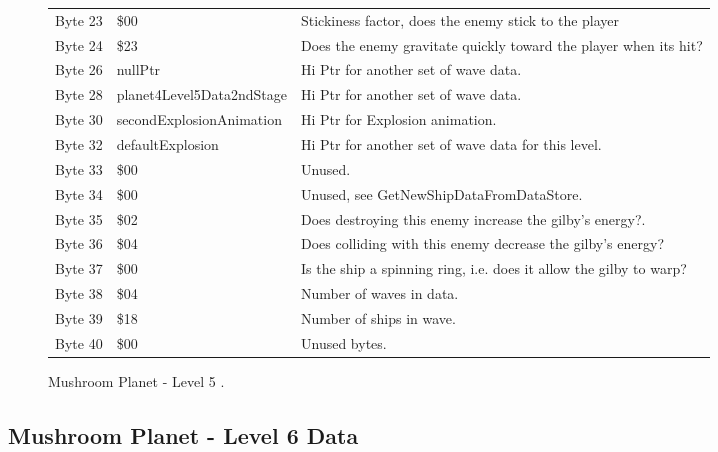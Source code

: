 \begin{figure}[H]
{\begin{adjustbox}{width=12cm}
\begin{tabular}{lll}
 Byte 23 & \$00                       & Stickiness factor, does the enemy stick to the player              \\
 Byte 24 & \$23                       & Does the enemy gravitate quickly toward the player when its hit?   \\
 Byte 26 & nullPtr                   & Hi Ptr for another set of wave data.                               \\
 Byte 28 & planet4Level5Data2ndStage & Hi Ptr for another set of wave data.                               \\
 Byte 30 & secondExplosionAnimation  & Hi Ptr for Explosion animation.                                    \\
 Byte 32 & defaultExplosion          & Hi Ptr for another set of wave data for this level.                \\
 Byte 33 & \$00                       & Unused.                                                            \\
 Byte 34 & \$00                       & Unused, see GetNewShipDataFromDataStore.                           \\
 Byte 35 & \$02                       & Does destroying this enemy increase the gilby's energy?.           \\
 Byte 36 & \$04                       & Does colliding with this enemy decrease the gilby's energy?        \\
 Byte 37 & \$00                       & Is the ship a spinning ring, i.e. does it allow the gilby to warp? \\
 Byte 38 & \$04                       & Number of waves in data.                                           \\
 Byte 39 & \$18                       & Number of ships in wave.                                           \\
 Byte 40 & \$00                       & Unused bytes.                                                      \\
\bottomrule
\end{tabular}

  \end{adjustbox}

  }\caption*{Mushroom Planet - Level 5
.}
\end{figure}

\clearpage
\subsection{Mushroom Planet - Level 6 Data}


